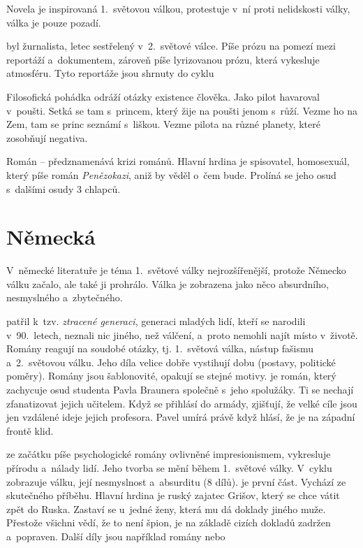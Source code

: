 Novela  je inspirovaná 1.~světovou válkou, protestuje
v~ní proti nelidskosti války, válka je pouze pozadí. 

\delic

 byl žurnalista, letec sestřelený
v~2.~světové válce. Píše prózu na pomezí mezi reportáží a~dokumentem,
zároveň píše lyrizovanou prózu, která vykesluje atmosféru.
Tyto reportáže jsou shrnuty do cyklu 

Filosofická pohádka  odráží otázky existence člověka.
Jako pilot havaroval v~poušti. Setká se tam s~princem, který žije na
poušti jenom s~růží. Vezme ho na Zem, tam se princ seznámí s~liškou.
Vezme pilota na různé planety, které zosobňují negativa.

\delic

Román  -- 
předznamenává krizi románů. Hlavní hrdina je spisovatel, homosexuál,
který píše román \emph{Penězokazi}, aniž by věděl o~čem bude.
Prolíná se jeho osud s~dalšími osudy 3 chlapců.

\section{Německá}
V~německé literatuře je téma 1.~světové války nejrozšířenější, protože
Německo válku začalo, ale také ji prohrálo. Válka je zobrazena jako něco
absurdního, nesmyslného a~zbytečného.

 patřil k~tzv. \emph{ztracené generaci},
generaci mladých lidí, kteří se narodili v~90.~letech, neznali nic
jiného, než válčení, a~proto nemohli najít místo v~životě. Romány
reagují na soudobé otázky, tj. 1.~světová válka, nástup fašismu
a~2.~světovou válku. Jeho díla velice dobře vystihují dobu (postavy,
politické poměry). Romány jsou šablonovité, opakují se stejné motivy.
 je román, který zachycuje osud studenta
Pavla Braunera společně s~jeho spolužáky. Ti se nechají zfanatizovat
jejich učitelem. Když se přihlásí do armády, zjišťují, že velké cíle
jsou jen vzdálené ideje jejich profesora. Pavel umírá právě když hlásí,
že je na západní frontě klid.

\delic

 ze začátku píše psychologické romány ovlivněné
impresionismem, vykresluje přírodu a~nálady lidí. Jeho tvorba se mění
během 1.~světové války. V~cyklu  zobrazuje
válku, její nesmyslnost a~absurditu (8 dílů).  je první část. Vychází ze skutečného příběhu. Hlavní hrdina je
ruský zajatec Grišov, který se chce vátit zpět do Ruska. Zastaví se
u~jedné ženy, která mu dá doklady jiného muže. Přestože všichni vědí, že
to není špion, je na základě cizích dokladů zadržen a~popraven. Další
díly jsou například romány  nebo 

